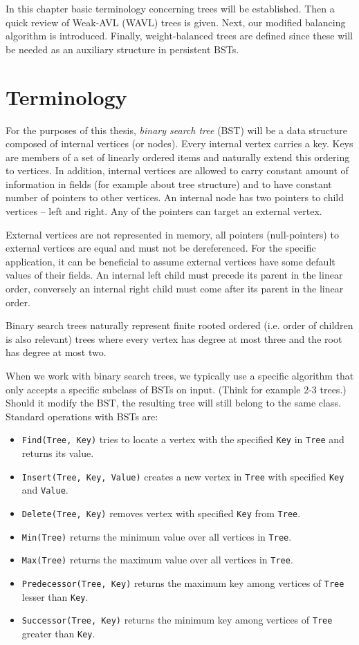 In this chapter basic terminology concerning trees will be established. Then a quick review of Weak-AVL (WAVL) trees is given. Next, our modified balancing algorithm is introduced. Finally, weight-balanced trees are defined since these will be needed as an auxiliary structure in persistent BSTs.

\section{Terminology}

For the purposes of this thesis, \emph{binary search tree} (BST) will be a data structure composed of internal vertices (or nodes). Every internal vertex carries a key. Keys are members of a set of linearly ordered items and naturally extend this ordering to vertices. In addition, internal vertices are allowed to carry constant amount of information in fields (for example about tree structure) and to have constant number of pointers to other vertices. An internal node has two pointers to child vertices -- left and right. Any of the pointers can target an external vertex. 

External vertices are not represented in memory, all pointers (null-pointers) to external vertices are equal and must not be dereferenced. For the specific application, it can be beneficial to assume external vertices have some default values of their fields. An internal left child must precede its parent in the linear order, conversely an internal right child must come after its parent in the linear order.

Binary search trees naturally represent finite rooted ordered (i.e. order of children is also relevant) trees where every vertex has degree at most three and the root has degree at most two.

When we work with binary search trees, we typically use a specific algorithm that only accepts a specific subclass of BSTs on input. (Think for example 2-3 trees.) Should it modify the BST, the resulting tree will still belong to the same class. Standard operations with BSTs are:

\begin{itemize}
	\item \texttt{Find(Tree, Key)} tries to locate a vertex with the specified \texttt{Key} in \texttt{Tree} and returns its value. 
	\item \texttt{Insert(Tree, Key, Value)} creates a new vertex in \texttt{Tree} with specified \texttt{Key} and \texttt{Value}.
	\item \texttt{Delete(Tree, Key)} removes vertex with specified \texttt{Key} from \texttt{Tree}.
	\item \texttt{Min(Tree)} returns the minimum value over all vertices in \texttt{Tree}.
	\item \texttt{Max(Tree)} returns the maximum value over all vertices in \texttt{Tree}.
	\item \texttt{Predecessor(Tree, Key)} returns the maximum key among vertices of \texttt{Tree} lesser than \texttt{Key}.
	\item \texttt{Successor(Tree, Key)} returns the minimum key among vertices of \texttt{Tree} greater than \texttt{Key}.
\end{itemize}

